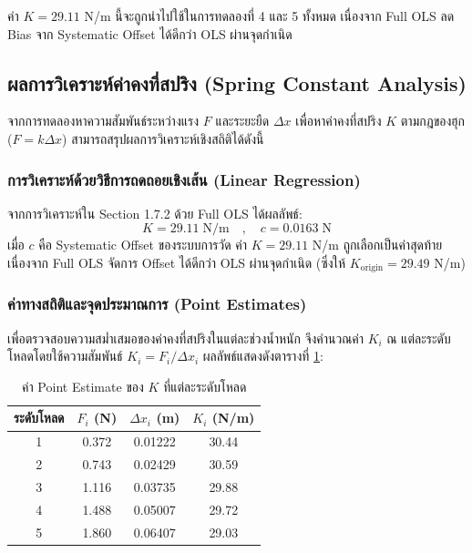 ค่า $K = 29.11$ N/m นี้จะถูกนำไปใช้ในการทดลองที่ 4 และ 5 ทั้งหมด เนื่องจาก Full OLS ลด Bias จาก Systematic Offset ได้ดีกว่า OLS ผ่านจุดกำเนิด

\subsection{ผลการวิเคราะห์ค่าคงที่สปริง (Spring Constant Analysis)}

จากการทดลองหาความสัมพันธ์ระหว่างแรง $F$ และระยะยืด $\Delta x$ เพื่อหาค่าคงที่สปริง $K$ ตามกฎของฮุก ($F = k\Delta x$) สามารถสรุปผลการวิเคราะห์เชิงสถิติได้ดังนี้

\subsubsection{การวิเคราะห์ด้วยวิธีการถดถอยเชิงเส้น (Linear Regression)}

จากการวิเคราะห์ใน Section 1.7.2 ด้วย Full OLS ได้ผลลัพธ์:
\begin{equation}
    \boxed{K = 29.11 \; \text{N/m}} \quad,\quad c = 0.0163 \; \text{N}
\end{equation}
เมื่อ $c$ คือ Systematic Offset ของระบบการวัด
ค่า $K = 29.11$ N/m ถูกเลือกเป็นค่าสุดท้ายเนื่องจาก Full OLS
จัดการ Offset ได้ดีกว่า OLS ผ่านจุดกำเนิด (ซึ่งให้ $K_\text{origin} = 29.49$ N/m)

\subsubsection{ค่าทางสถิติและจุดประมาณการ (Point Estimates)}

เพื่อตรวจสอบความสม่ำเสมอของค่าคงที่สปริงในแต่ละช่วงน้ำหนัก จึงคำนวณค่า $K_i$ ณ แต่ละระดับโหลดโดยใช้ความสัมพันธ์ $K_i = F_i / \Delta x_i$ ผลลัพธ์แสดงดังตารางที่ \ref{tab:k_pointest}:

\begin{table}[h]
    \centering
    \caption{ค่า Point Estimate ของ $K$ ที่แต่ละระดับโหลด}
    \label{tab:k_pointest}
    \begin{tabular}{cccc}
        \hline
        \textbf{ระดับโหลด} & \textbf{$F_i$ (N)} & \textbf{$\Delta x_i$ (m)} & \textbf{$K_i$ (N/m)} \\
        \hline
        1 & 0.372 & 0.01222 & 30.44 \\
        2 & 0.743 & 0.02429 & 30.59 \\
        3 & 1.116 & 0.03735 & 29.88 \\
        4 & 1.488 & 0.05007 & 29.72 \\
        5 & 1.860 & 0.06407 & 29.03 \\
        \hline
    \end{tabular}
\end{table}

